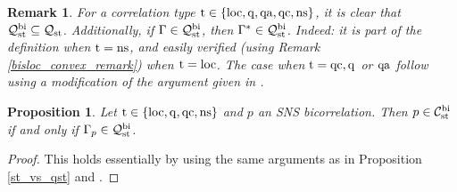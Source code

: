 \documentclass[11pt]{amsart}
\newtheorem{proposition}[theorem]{Proposition}
\newtheorem{remark}[theorem]{Remark}
\newcommand{\cl}[1]{\mathcal{#1}}
\begin{document}
\begin{remark}
\rm For a correlation type ${\rm t} \in \{\rm loc, q, qa, qc, ns\}$, it is clear that $\cl{Q}_{\rm st}^{\rm bi} \subseteq \cl{Q}_{\rm st}$. Additionally, if $\Gamma \in \cl{Q}_{\rm st}^{\rm bi}$, then $\Gamma^{*} \in \cl{Q}_{\rm st}^{\rm bi}$. Indeed: it is part of the definition when ${\rm t} = {\rm ns}$, and easily verified (using Remark \ref{bisloc_convex_remark}) when ${\rm t} = {\rm loc}$. The case when ${\rm t} = {\rm qc, q}$ or ${\rm qa}$ follow using a modification of the argument given in \cite[Remark 5.2]{bhtt}.
\end{remark}

\begin{proposition}
Let ${\rm t} \in \{\rm loc, q, qc, ns\}$ and $p$ an SNS bicorrelation. Then $p \in \cl{C}_{\rm st}^{\rm bi}$ if and only if $\Gamma_{p} \in \cl{Q}_{\rm st}^{\rm bi}$.
\end{proposition}
\begin{proof}
This holds essentially by using the same arguments as in Proposition \ref{st_vs_qst} and \cite[Proposition 5.9]{bhtt}.
\end{proof}
\end{document}
